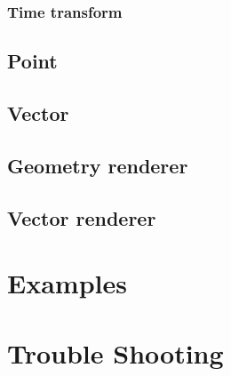 \documentclass{article}
\begin{document}
\subsubsection{Time transform}\label{sss:time_trans}
\subsection{Point}\label{ss:point}
\subsection{Vector}\label{ss:vector}
\subsection{Geometry renderer}\label{ss:geo_rend}
\subsection{Vector renderer}\label{ss:vec_rend}
\section{Examples}\label{s:examples}
\section{Trouble Shooting}\label{s:trouble_shooting}
\end{document}
